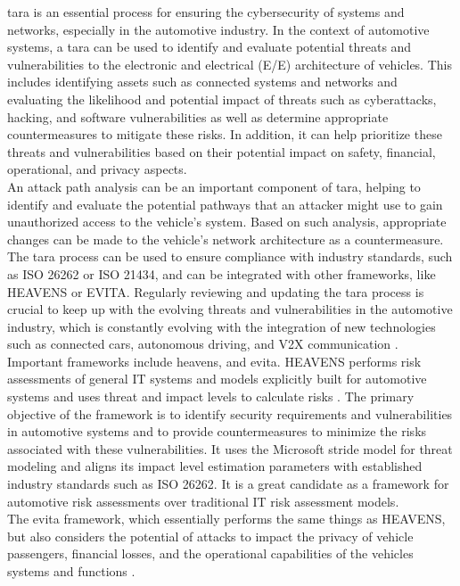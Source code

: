 \acrlong{tara} is an essential process for ensuring the cybersecurity of systems and networks, especially in the automotive industry. 
In the context of automotive systems, a \acrshort{tara} can be used to identify and evaluate potential threats and vulnerabilities to the electronic and electrical (E/E) architecture of vehicles.
This includes identifying assets such as connected systems and networks and evaluating the likelihood and potential impact of threats such as 
cyberattacks, hacking, and software vulnerabilities as well as determine appropriate countermeasures to mitigate these risks.
In addition, it can help prioritize these threats and vulnerabilities based on their potential impact on safety, financial, operational, and privacy aspects.\\
An attack path analysis can be an important component of \acrshort{tara}, helping to identify and evaluate the potential pathways that an attacker might use to gain unauthorized access to the vehicle's system. 
Based on such analysis, appropriate changes can be made to the vehicle's network architecture as a countermeasure.
The \acrshort{tara} process can be used to ensure compliance with industry standards, such as ISO 26262 or ISO 21434, and can be integrated with other frameworks, like HEAVENS or EVITA. 
Regularly reviewing and updating the \acrshort{tara} process is crucial to keep up with the evolving threats and vulnerabilities in the automotive industry, 
which is constantly evolving with the integration of new technologies such as connected cars, autonomous driving, and V2X communication \cite{tara}.\\

Important frameworks include \acrlong{heavens}, and \acrlong{evita}.
HEAVENS performs risk assessments of general IT systems and models explicitly built for automotive systems and uses threat and impact levels to calculate risks \cite{heavens}.
The primary objective of the framework is to identify security requirements and vulnerabilities in automotive systems and to provide countermeasures to minimize the risks associated with these vulnerabilities. 
It uses the Microsoft \acrshort{stride} model for threat modeling and aligns its impact level estimation parameters with established industry standards such as ISO 26262. 
It is a great candidate as a framework for automotive risk assessments over traditional IT risk assessment models.\\
The \acrshort{evita} framework, which essentially performs the same things as HEAVENS, 
but also considers the potential of attacks to impact the privacy of vehicle passengers, financial losses, and the operational capabilities of the vehicles systems and functions \cite{evita}.\\


